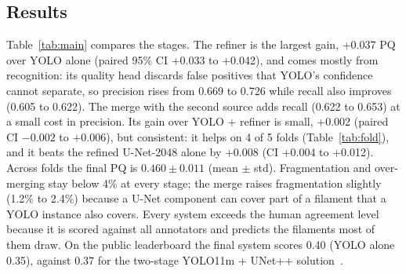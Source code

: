 \documentclass[sigconf]{acmart}
\begin{document}
\subsection{Results}
    Table~\ref{tab:main} compares the stages. The refiner is the largest gain, +0.037 PQ over YOLO alone
    (paired 95\% CI +0.033 to +0.042), and comes mostly from recognition: its quality head discards false
    positives that YOLO's confidence cannot separate, so precision rises from 0.669 to 0.726 while recall
    also improves (0.605 to 0.622). The merge with the second source adds recall (0.622 to 0.653) at a small
    cost in precision. Its gain over YOLO + refiner is small, +0.002 (paired CI $-0.002$ to $+0.006$), but
    consistent: it helps on 4 of 5 folds (Table~\ref{tab:fold}), and it beats the refined U-Net-2048 alone
    by +0.008 (CI +0.004 to +0.012). Across folds the final PQ is $0.460 \pm 0.011$ (mean $\pm$ std).
    Fragmentation and over-merging stay below 4\% at every stage; the merge raises fragmentation slightly
    (1.2\% to 2.4\%) because a U-Net component can cover part of a filament that a YOLO instance also
    covers. Every system exceeds the human agreement level because it is scored against all annotators and
    predicts the filaments most of them draw. On the public leaderboard the final system scores 0.40
    (YOLO alone 0.35), against 0.37 for the two-stage YOLO11m + UNet++ solution~\cite{ghosh2026twostage}.

\begin{table}[t]
  \centering
  \caption{OOF PQ per fold.}
  \label{tab:fold}
\end{table}
\end{document}
